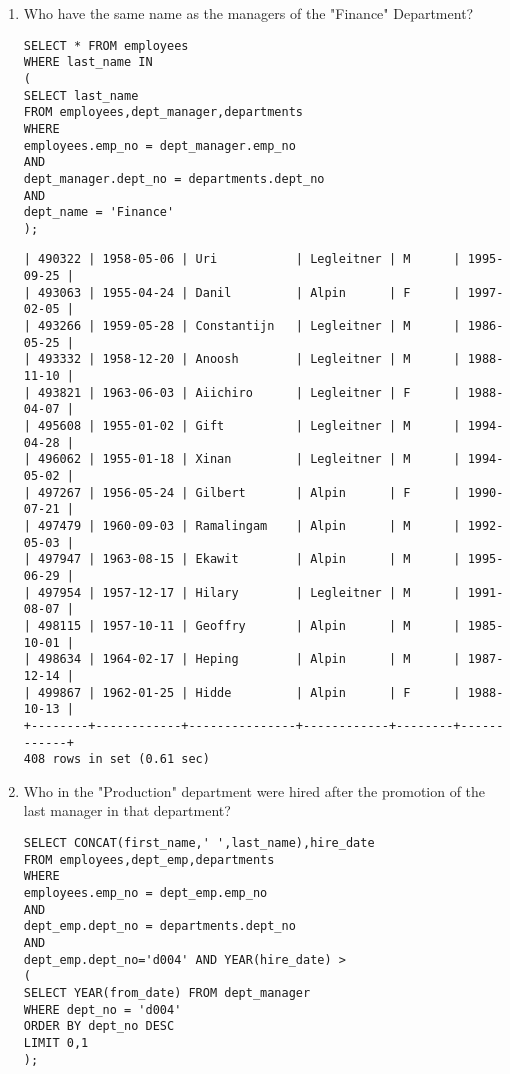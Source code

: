\documentclass[]{article}
\begin{document}
\begin{enumerate}

\item Who have the same name as the managers of the "Finance" Department?

\begin{verbatim}
SELECT * FROM employees 
WHERE last_name IN
(
SELECT last_name
FROM employees,dept_manager,departments
WHERE 
employees.emp_no = dept_manager.emp_no
AND
dept_manager.dept_no = departments.dept_no
AND
dept_name = 'Finance'
);
\end{verbatim}

\begin{verbatim}
| 490322 | 1958-05-06 | Uri           | Legleitner | M      | 1995-09-25 |
| 493063 | 1955-04-24 | Danil         | Alpin      | F      | 1997-02-05 |
| 493266 | 1959-05-28 | Constantijn   | Legleitner | M      | 1986-05-25 |
| 493332 | 1958-12-20 | Anoosh        | Legleitner | M      | 1988-11-10 |
| 493821 | 1963-06-03 | Aiichiro      | Legleitner | F      | 1988-04-07 |
| 495608 | 1955-01-02 | Gift          | Legleitner | M      | 1994-04-28 |
| 496062 | 1955-01-18 | Xinan         | Legleitner | M      | 1994-05-02 |
| 497267 | 1956-05-24 | Gilbert       | Alpin      | F      | 1990-07-21 |
| 497479 | 1960-09-03 | Ramalingam    | Alpin      | M      | 1992-05-03 |
| 497947 | 1963-08-15 | Ekawit        | Alpin      | M      | 1995-06-29 |
| 497954 | 1957-12-17 | Hilary        | Legleitner | M      | 1991-08-07 |
| 498115 | 1957-10-11 | Geoffry       | Alpin      | M      | 1985-10-01 |
| 498634 | 1964-02-17 | Heping        | Alpin      | M      | 1987-12-14 |
| 499867 | 1962-01-25 | Hidde         | Alpin      | F      | 1988-10-13 |
+--------+------------+---------------+------------+--------+------------+
408 rows in set (0.61 sec)
\end{verbatim}

\item Who in the "Production" department were hired after the promotion of the last manager in that department?

\begin{verbatim}
SELECT CONCAT(first_name,' ',last_name),hire_date
FROM employees,dept_emp,departments
WHERE
employees.emp_no = dept_emp.emp_no
AND
dept_emp.dept_no = departments.dept_no
AND
dept_emp.dept_no='d004' AND YEAR(hire_date) > 
(
SELECT YEAR(from_date) FROM dept_manager
WHERE dept_no = 'd004'
ORDER BY dept_no DESC
LIMIT 0,1
);
\end{verbatim}


\end{enumerate}
\end{document}
